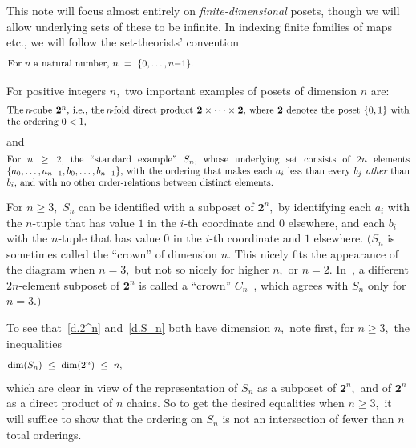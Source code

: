 \documentclass{amsart}
\numberwithin{equation}{section}
\numberwithin{theorem}{section}
\newcommand{\2}{\mathbf{2}}
\begin{document}
This note will focus almost entirely on {\em finite-dimensional}
posets, though we will allow underlying sets of these to be infinite.
In indexing finite families of maps etc.,
we will follow the set-theorists' convention
%
\begin{equation}\begin{minipage}[c]{35pc}\label{d.n=}
For $n$ a natural number, $n\ =\ \{0,\dots,n{-}1\}.$
\end{minipage}\end{equation}

For positive integers $n,$ two important examples of posets of
dimension $n$ are:
%
\begin{equation}\begin{minipage}[c]{35pc}\label{d.2^n}
The $\!n\!$-cube $\2^n,$ i.e., the $\!n\!$-fold
direct product $\2\times\dots\times \2,$ where
$\2$ denotes the poset $\{0,1\}$ with the ordering $0 < 1,$
\end{minipage}\end{equation}
%
and
%
\begin{equation}\begin{minipage}[c]{35pc}\label{d.S_n}
For $n\geq 2,$ the ``standard example'' $S_n,$ whose underlying set
consists of $2n$ elements $\{a_0,\dots,a_{n-1}, b_0,\dots,b_{n-1}\},$
with the ordering that makes each $a_i$ less than every $b_j$
{\em other} than $b_i,$ and with no other order-relations between
distinct elements.
\end{minipage}\end{equation}

For $n\geq 3,$ $S_n$ can be identified with a subposet of $\2^n,$ by
identifying each $a_i$ with the $\!n\!$-tuple that has
value $1$ in the $\!i\!$-th coordinate and $0$
elsewhere, and each $b_i$ with the $\!n\!$-tuple that has
value $0$ in the $\!i\!$-th coordinate and $1$ elsewhere.
$(S_n$ is sometimes called the ``crown'' of dimension $n.$
This nicely fits the appearance of the diagram when
$n=3,$ but not so nicely for higher $n,$ or $n=2.$
In~\cite{F+T+W}, a different $\!2n\!$-element subposet of
$\2^n$ is called a ``crown''
$C_n$~\cite[Fig.~6, last two diagrams]{F+T+W},
which agrees with $S_n$ only for $n=3.)$

To see that~\eqref{d.2^n} and~\eqref{d.S_n} both have dimension $n,$
note first, for $n\geq 3,$ the inequalities
%
\begin{equation}\begin{minipage}[c]{35pc}\label{d.Sn2nn}
$\dim(S_n)\ \leq\ \dim(2^n)\ \leq\ n,$
\end{minipage}\end{equation}
%
which are clear in view of the representation of $S_n$ as a subposet of
$\2^n,$ and of $\2^n$ as a direct product of $n$ chains.
So to get the desired equalities
when $n\geq 3,$ it will suffice to show that the ordering on $S_n$ is
not an intersection of fewer than $n$ total orderings.
\end{document}
